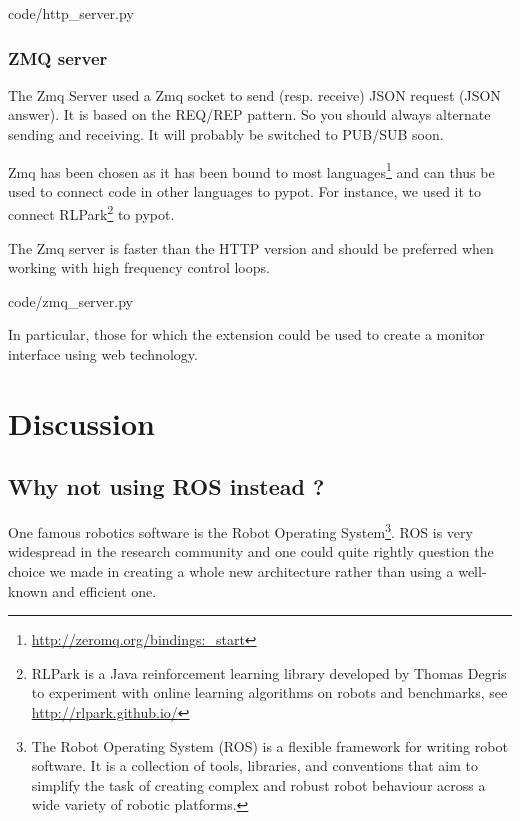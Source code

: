 
    {code/http_server.py}


\subsubsection{ZMQ server} %

The Zmq Server used a Zmq socket to send (resp. receive) JSON request (JSON answer). It is based on the REQ/REP pattern. So you should always alternate sending and receiving. It will probably be switched to PUB/SUB soon.

Zmq has been chosen as it has been bound to most languages\footnote{\url{http://zeromq.org/bindings:_start}} and can thus be used to connect code in other languages to pypot. For instance, we used it to connect RLPark\footnote{RLPark is a Java reinforcement learning library developed by Thomas Degris to experiment with online learning algorithms on robots and benchmarks, see \url{http://rlpark.github.io/}} to pypot.

The Zmq server is faster than the HTTP version and should be preferred when working with high frequency control loops.


    {code/zmq_server.py}


In particular, those for which the extension could be used to create a monitor interface using web technology.



\section{Discussion} %

\subsection{Why not using ROS instead ?} %

One famous robotics software is the Robot Operating System\footnote{The Robot Operating System (ROS) is a flexible framework for writing robot software. It is a collection of tools, libraries, and conventions that aim to simplify the task of creating complex and robust robot behaviour across a wide variety of robotic platforms.}. ROS is very widespread in the research community and one could quite rightly question the choice we made in creating a whole new architecture rather than using a well-known and efficient one.

